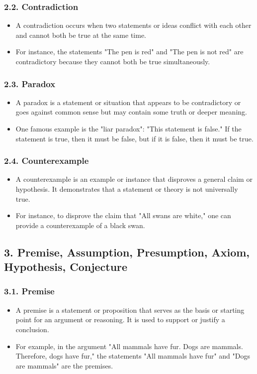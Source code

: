 \documentclass{article}
\begin{document}
\subsubsection*{2.2. Contradiction}
\begin{itemize}
\item A contradiction occurs when two statements or ideas conflict with each other and cannot both be true at the same time.
\item For instance, the statements "The pen is red" and "The pen is not red" are contradictory because they cannot both be true simultaneously.
\end{itemize}
\subsubsection*{2.3. Paradox}
\begin{itemize}
\item A paradox is a statement or situation that appears to be contradictory or goes against common sense but may contain some truth or deeper meaning.
\item One famous example is the "liar paradox": "This statement is false." If the statement is true, then it must be false, but if it is false, then it must be true.
\end{itemize}
\subsubsection*{2.4. Counterexample}
\begin{itemize}
\item A counterexample is an example or instance that disproves a general claim or hypothesis. It demonstrates that a statement or theory is not universally true.
\item For instance, to disprove the claim that "All swans are white," one can provide a counterexample of a black swan.
\end{itemize}
\clearpage
\subsection*{3. Premise, Assumption, Presumption, Axiom, Hypothesis, Conjecture}
\subsubsection*{3.1. Premise}
\begin{itemize}
\item A premise is a statement or proposition that serves as the basis or starting point for an argument or reasoning. It is used to support or justify a conclusion.
\item For example, in the argument "All mammals have fur. Dogs are mammals. Therefore, dogs have fur," the statements "All mammals have fur" and "Dogs are mammals" are the premises.
\end{itemize}
\end{document}
